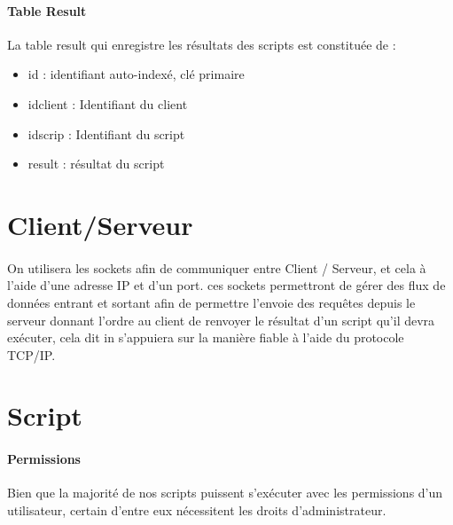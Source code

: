\documentclass[11pt,a4paper,titlepage, oneside]{article}
\begin{document}
		\paragraph{Table Result}
			La table result qui enregistre les résultats des scripts est constituée de :
			\begin{itemize}
				\item id : identifiant auto-indexé, clé primaire
				\item idclient : Identifiant du client
				\item idscrip : Identifiant du script
				\item result : résultat du script
			\end{itemize}
		
		
\newpage
\section{{\color{red} Client/Serveur}}
\paragraph{}
On utilisera les sockets afin de communiquer entre Client / Serveur, et cela à l'aide d'une adresse IP et d'un port. ces sockets permettront de gérer des flux de données entrant et sortant afin de permettre l'envoie des requêtes depuis le serveur donnant l'ordre au client de renvoyer le résultat d'un script qu'il devra exécuter, cela dit in s'appuiera sur la manière fiable à l'aide du protocole TCP/IP. 


\newpage
\section{{\color{red} Script }}
	\paragraph{Permissions}
		Bien que la majorité de nos scripts puissent s'exécuter avec les permissions d'un utilisateur, certain d'entre eux nécessitent les droits d'administrateur.\\
\end{document}
